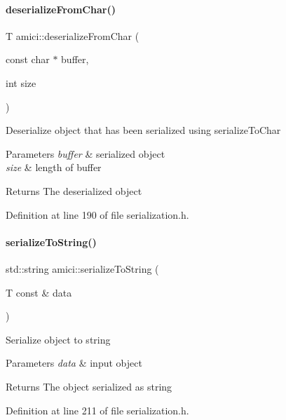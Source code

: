 \paragraph{\texorpdfstring{deserialize\+From\+Char()}{deserializeFromChar()}}
{\footnotesize\ttfamily T amici\+::deserialize\+From\+Char (\begin{DoxyParamCaption}\item[{const char $\ast$}]{buffer,  }\item[{int}]{size }\end{DoxyParamCaption})}

Deserialize object that has been serialized using serialize\+To\+Char


\begin{DoxyParams}{Parameters}
{\em buffer} & serialized object \\
\hline
{\em size} & length of buffer\\
\hline
\end{DoxyParams}
\begin{DoxyReturn}{Returns}
The deserialized object
\end{DoxyReturn}


Definition at line 190 of file serialization.\+h.

\mbox{\label{namespaceamici_aed4ae7f193798ade342a0f70491e849e}} 
\paragraph{\texorpdfstring{serialize\+To\+String()}{serializeToString()}}
{\footnotesize\ttfamily std\+::string amici\+::serialize\+To\+String (\begin{DoxyParamCaption}\item[{T const \&}]{data }\end{DoxyParamCaption})}

Serialize object to string


\begin{DoxyParams}{Parameters}
{\em data} & input object\\
\hline
\end{DoxyParams}
\begin{DoxyReturn}{Returns}
The object serialized as string
\end{DoxyReturn}


Definition at line 211 of file serialization.\+h.

